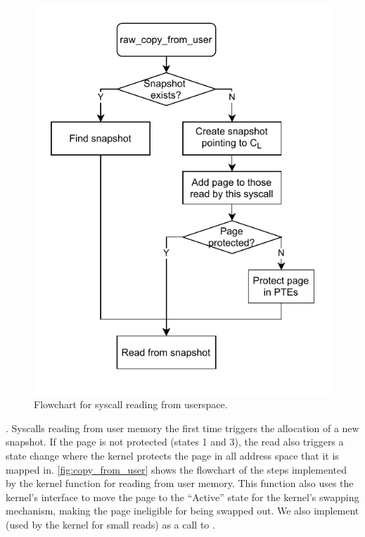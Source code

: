 \documentclass[letterpaper,twocolumn,10pt]{article}
\begin{document}
\begin{figure}[]
  \centering
  \includegraphics[width=0.8\linewidth]{img/copy_from_user.pdf}
  \caption{Flowchart for syscall reading from userspace.}
  \label{fig:copy_from_user}
\end{figure}

.
Syscalls reading from user memory the first time triggers the 
allocation of a new snapshot. 
If the page is not protected (states 1 and 3), the read also 
triggers a state change where the kernel protects the page
in all address space that it is mapped in. 
\autoref{fig:copy_from_user} shows the flowchart of the steps
implemented by the kernel function  for 
reading from user memory.
This function also uses the kernel's  
interface to move the page to the ``Active'' state for the 
kernel's swapping mechanism, making the page ineligible for being 
swapped out. 
We also implement  (used by the kernel for small 
reads) as a call to .
\end{document}
